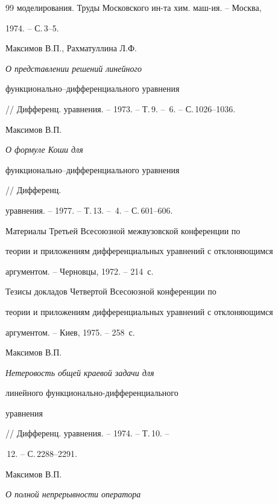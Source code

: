 \begin{thebibliography}{99}
моделирования. Труды Московского ин-та хим. маш-ия. -- Москва,


1974. -- С.\,3--5.







Максимов В.П., Рахматуллина Л.Ф. {\em О представлении решений линейного


функционально--дифференциального уравнения}


// Дифференц. уравнения. -- 1973. -- Т.\,9. -- \No\,6. -- С.\,1026--1036.







Максимов В.П. {\em О формуле Коши для


функционально--дифференциального уравнения} // Дифференц.


уравнения. -- 1977. -- Т.\,13. -- \No\,4. -- С.\,601--606.







Материалы Третьей Всесоюзной межвузовской конференции по


теории и приложениям дифференциальных уравнений с отклоняющимся


аргументом. -- Черновцы, 1972. -- 214~с.







Тезисы докладов Четвертой Всесоюзной конференции по


теории и приложениям дифференциальных уравнений с отклоняющимся


аргументом. -- Киев, 1975. -- 258~с.







Максимов В.П. {\em Нетеровость общей краевой задачи для


линейного функционально-дифференциального


уравнения} // Дифференц. уравнения. -- 1974. -- Т.\,10. --


\No\,12. -- С.\,2288--2291.







Максимов В.П. {\em О полной непрерывности оператора


}
\end{thebibliography}
